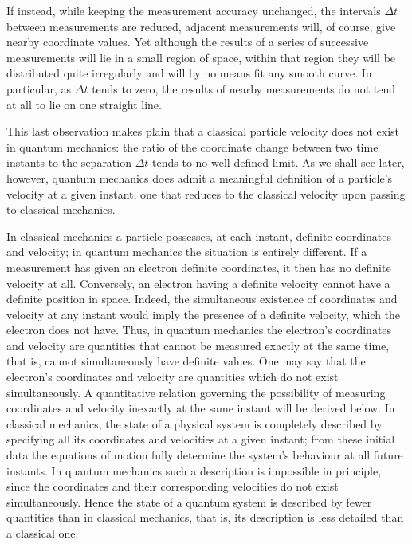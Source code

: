 If instead, while keeping the measurement accuracy unchanged, the intervals
$\Delta t$ between measurements are reduced, adjacent measurements will, of
course, give nearby coordinate values. Yet although the results of a series of
successive measurements will lie in a small region of space, within that
region they will be distributed quite irregularly and will by no means fit any
smooth curve. In particular, as $\Delta t$ tends to zero, the results of
nearby measurements do not tend at all to lie on one straight line.

This last observation makes plain that a classical particle velocity does not
exist in quantum mechanics: the ratio of the coordinate change between two
time instants to the separation $\Delta t$ tends to no well-defined limit. As we shall see later, however, quantum mechanics
does admit a meaningful definition of a particle's velocity at a given
instant, one that reduces to the classical velocity upon passing to classical
mechanics.

In classical mechanics a particle possesses, at each instant, definite
coordinates and velocity; in quantum mechanics the situation is entirely
different. If a measurement has given an electron definite coordinates, it
then has no definite velocity at all. Conversely, an electron having a
definite velocity cannot have a definite position in space. Indeed, the
simultaneous existence of coordinates and velocity at any instant would imply
the presence of a definite velocity, which the electron does not have. Thus,
in quantum mechanics the electron's coordinates and velocity are quantities
that cannot be measured exactly at the same time, that is, cannot
simultaneously have definite values. One may say that the electron's
coordinates and velocity are quantities which do not exist simultaneously. A
quantitative relation governing the possibility of measuring coordinates and
velocity inexactly at the same instant will be derived below.
In classical mechanics, the state of a physical system is completely described
by specifying all its coordinates and velocities at a given instant; from
these initial data the equations of motion fully determine the system's
behaviour at all future instants. In quantum mechanics
such a description is impossible in principle, since the coordinates and
their corresponding velocities do not exist simultaneously. Hence the state
of a quantum system is described by fewer quantities than in classical
mechanics, that is, its description is less detailed than a classical one.

